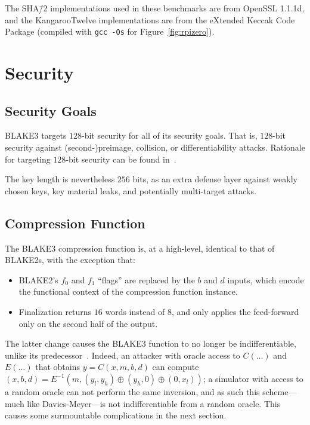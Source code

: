 \documentclass[11pt,notitlepage,a4paper]{article}
\begin{document}
The SHA\=/2 implementations used in these benchmarks are from OpenSSL 1.1.1d, and the
KangarooTwelve implementations are from the eXtended Keccak Code Package
(compiled with \texttt{gcc -Os} for Figure~\ref{fig:rpizero}).

\section{Security}\label{sec:security}

\subsection{Security Goals}\label{sec:goals}

BLAKE3 targets $128$-bit security for all of its security goals. That
is, $128$-bit security against (second-)preimage, collision, or
differentiability attacks. 
Rationale for targeting $128$-bit security can be found
in~\cite[\S2]{TMC}.

The key length is nevertheless $256$ bits, as an extra defense layer
against weakly chosen keys, key material leaks, and potentially
multi-target attacks.


\subsection{Compression Function}\label{sec:compressindiff}

The BLAKE3 compression function is, at a high-level, identical to that of BLAKE2s, with
the exception that:

\begin{itemize}
  \item BLAKE2's $f_0$ and $f_1$ ``flags'' are replaced by the $b$ and $d$ inputs, which
  encode the functional context of the compression function instance.
  \item Finalization returns $16$ words instead of $8$, and only applies the feed-forward only on the second half of the output.
\end{itemize}

The latter change causes the BLAKE3 function to no longer be indifferentiable, unlike its predecessor~\cite{DBLP:journals/tosc/LuykxMN16}. Indeed, an attacker with oracle access to $C(\dots)$ and $E(\dots)$ that obtains $y = C(x, m, b, d)$ can compute $(x, b, d) = E^{-1}(m, (y_l, y_h) \oplus (y_h, 0) \oplus (0, x_l))$; a simulator with access to a random oracle can not perform the same inversion, and as such this scheme---much like Davies-Meyer---is not indifferentiable from a random oracle. This causes some surmountable complications in the next section.
\end{document}
